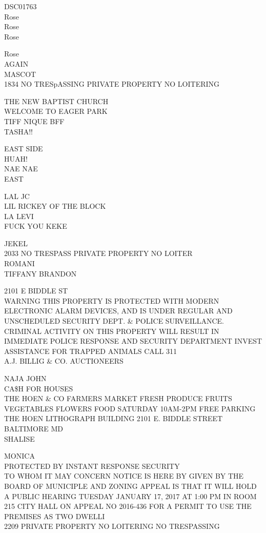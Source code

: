 \documentclass[10pt,letterpaper]{article}
\begin{document}
DSC01763\\
Rose\\
Rose\\
Rose

Rose\\
AGAIN\\
MASCOT\\
1834 NO TRESpASSING PRIVATE PROPERTY NO LOITERING

THE NEW BAPTIST CHURCH\\
WELCOME TO EAGER PARK\\
TIFF NIQUE BFF\\
TASHA!!

EAST SIDE\\
HUAH!\\
NAE NAE\\
EAST

LAL JC\\
LIL RICKEY OF THE BLOCK\\
LA LEVI\\
FUCK YOU KEKE

JEKEL\\
2033 NO TRESPASS PRIVATE PROPERTY NO LOITER\\
ROMANI\\
TIFFANY BRANDON

2101 E BIDDLE ST\\
WARNING THIS PROPERTY IS PROTECTED WITH MODERN ELECTRONIC ALARM DEVICES, AND IS UNDER REGULAR AND UNSCHEDULED SECURITY DEPT. \& POLICE SURVEILLANCE.  CRIMINAL ACTIVITY ON THIS PROPERTY WILL RESULT IN IMMEDIATE POLICE RESPONSE AND SECURITY DEPARTMENT INVEST\\
ASSISTANCE FOR TRAPPED ANIMALS CALL 311\\
A.J. BILLIG \& CO. AUCTIONEERS

NAJA JOHN\\
CA\$H FOR HOUSES\\
THE HOEN \& CO FARMERS MARKET  FRESH PRODUCE FRUITS VEGETABLES FLOWERS FOOD SATURDAY 10AM{-}2PM FREE PARKING THE HOEN LITHOGRAPH BUILDING 2101 E. BIDDLE STREET BALTIMORE MD\\
SHALISE

MONICA\\
PROTECTED BY INSTANT RESPONSE SECURITY\\
TO WHOM IT MAY CONCERN NOTICE IS HERE BY GIVEN BY THE BOARD OF MUNICIPLE AND ZONING APPEAL IS THAT IT WILL HOLD A PUBLIC HEARING TUESDAY JANUARY 17, 2017 AT 1:00 PM IN ROOM 215 CITY HALL ON APPEAL NO 2016{-}436 FOR A PERMIT TO USE THE PREMISES AS TWO DWELLI\\
2209 PRIVATE PROPERTY NO LOITERING NO TRESPASSING
\end{document}
